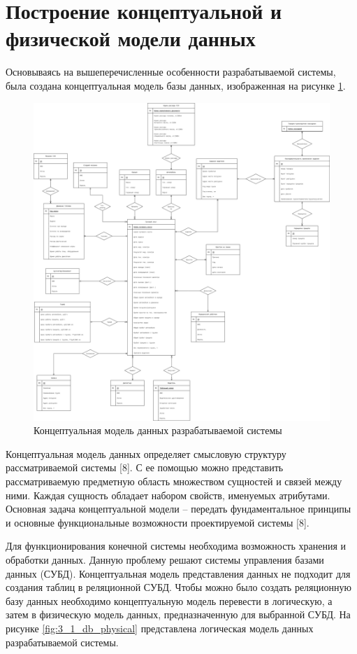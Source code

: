 \documentclass[../nirs.tex]{subfiles}
\begin{document}
\section{Построение концептуальной и физической модели данных}
Основываясь на вышеперечисленные особенности разрабатываемой системы, была
создана концептуальная модель базы данных, изображенная на рисунке
\ref{fig:3_1_db_conceptual}.

\begin{figure}[H]
	\centering
	\includegraphics[keepaspectratio,width=\textwidth]{../2/images/2_1_3_er-diagram.png}
	\caption{Концептуальная модель данных разрабатываемой системы}
	\label{fig:3_1_db_conceptual}
\end{figure}

Концептуальная модель данных определяет смысловую структуру рассматриваемой
системы [8]. С ее помощью можно представить рассматриваемую предметную область
множеством сущностей и связей между ними. Каждая сущность обладает набором
свойств, именуемых атрибутами. Основная задача концептуальной модели -- передать
фундаментальное принципы и основные функциональные возможности проектируемой
системы [8].

Для функционирования конечной системы необходима возможность хранения и
обработки данных. Данную проблему решают системы управления базами данных
(СУБД). Концептуальная модель представления данных не подходит для создания
таблиц в реляционной СУБД. Чтобы можно было создать реляционную базу данных
необходимо концептуальную модель перевести в логическую, а затем в физическую
модель данных, предназначенную для выбранной СУБД. На рисунке
\ref{fig:3_1_db_physical} представлена логическая модель данных разрабатываемой
системы.
\end{document}
